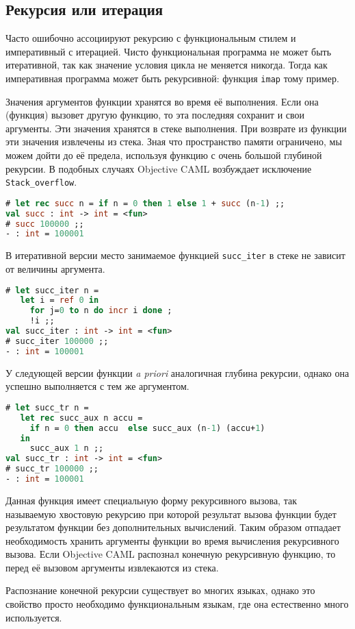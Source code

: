 \subsection{Рекурсия или итерация}
\label{subsec:recursive_or_iterative}

Часто ошибочно ассоциируют рекурсию с функциональным стилем и императивный с
итерацией. Чисто функциональная программа не может быть итеративной, так как
значение условия цикла не меняется никогда. Тогда как императивная программа
может быть рекурсивной: функция \texttt{imap} тому пример.

Значения аргументов функции хранятся во время её выполнения. Если она (функция)
вызовет другую функцию, то эта последняя сохранит и свои аргументы. Эти значения
хранятся в стеке выполнения. При возврате из функции эти значения извлечены из
стека. Зная что пространство памяти ограничено, мы можем дойти до её предела,
используя функцию с очень большой глубиной рекурсии. В подобных случаях
Objective CAML возбуждает исключение \texttt{Stack\_overflow}.

\begin{lstlisting}[language=OCaml]
# let rec succ n = if n = 0 then 1 else 1 + succ (n-1) ;;
val succ : int -> int = <fun>
# succ 100000 ;;
- : int = 100001
\end{lstlisting}

В итеративной версии место занимаемое функцией \texttt{succ\_iter} в стеке не
зависит от величины аргумента.

\begin{lstlisting}[language=OCaml]
# let succ_iter n =
   let i = ref 0 in
     for j=0 to n do incr i done ;
     !i ;;
val succ_iter : int -> int = <fun>
# succ_iter 100000 ;;
- : int = 100001
\end{lstlisting}

У следующей версии функции {\it a priori} аналогичная глубина рекурсии, однако
она успешно выполняется с тем же аргументом.

\begin{lstlisting}[language=OCaml]
# let succ_tr n =
   let rec succ_aux n accu =
     if n = 0 then accu  else succ_aux (n-1) (accu+1)
   in
     succ_aux 1 n ;;
val succ_tr : int -> int = <fun>
# succ_tr 100000 ;;
- : int = 100001
\end{lstlisting}

Данная функция имеет специальную форму рекурсивного вызова, так называемую
хвостовую рекурсию при которой результат вызова функции будет результатом
функции без дополнительных вычислений. Таким образом отпадает необходимость
хранить аргументы функции во время вычисления рекурсивного вызова. Если
Objective CAML распознал конечную рекурсивную функцию, то перед её вызовом
аргументы извлекаются из стека.

Распознание конечной рекурсии существует во многих языках, однако это свойство
просто необходимо функциональным языкам, где она естественно много используется.